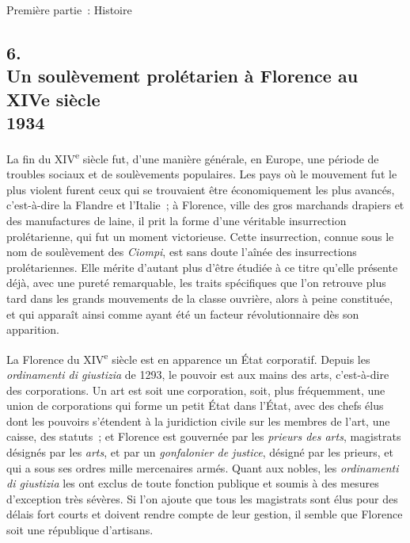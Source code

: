 \documentclass[french,twoside]{book} %
\begin{document}
\begin{center}
\noindent \centerline{Première partie : Histoire}
\end{center}

\subsection[{6. Un soulèvement prolétarien à Florence au XIVe siècle, 1934}]{6. \\
Un soulèvement prolétarien à Florence au XIVe siècle \\
1934}
\noindent La fin du XIV\textsuperscript{e} siècle fut, d'une manière générale, en Europe, une période de troubles sociaux et de soulèvements populaires. Les pays où le mouvement fut le plus violent furent ceux qui se trouvaient être économiquement les plus avancés, c'est-à-dire la Flandre et l'Italie ; à Florence, ville des gros marchands drapiers et des manufactures de laine, il prit la forme d'une véritable insurrec­tion prolétarienne, qui fut un moment victorieuse. Cette insurrection, connue sous le nom de soulèvement des {\itshape Ciompi}, est sans doute l'aînée des insurrec­tions prolétariennes. Elle mérite d'autant plus d'être étudiée à ce titre qu'elle présente déjà, avec une pureté remarquable, les traits spécifiques que l'on retrouve plus tard dans les grands mouvements de la classe ouvrière, alors à peine constituée, et qui apparaît ainsi comme ayant été un facteur révolution­naire dès son apparition.\par
La Florence du XIV\textsuperscript{e} siècle est en apparence un État corporatif. Depuis les {\itshape ordinamenti di giustizia} de 1293, le pouvoir est aux mains des arts, c'est-à-dire des corporations. Un art est soit une corporation, soit, plus fréquemment, une union de corporations qui forme un petit État dans l'État, avec des chefs élus dont les pouvoirs s'étendent à la juridiction civile sur les membres de l'art, une caisse, des statuts ; et Florence est gouvernée par les {\itshape prieurs des arts}, magis­trats désignés par les {\itshape arts}, et par un {\itshape gonfalonier de justice}, désigné par les prieurs, et qui a sous ses ordres mille mercenaires armés. Quant aux nobles, les {\itshape ordinamenti di giustizia} les ont exclus de toute fonction publique et soumis à des mesures d'exception très sévères. Si l'on ajoute que tous les magistrats sont élus pour des délais fort courts et doivent rendre compte de leur gestion, il semble que Florence soit une république d'artisans.\par
\end{document}
